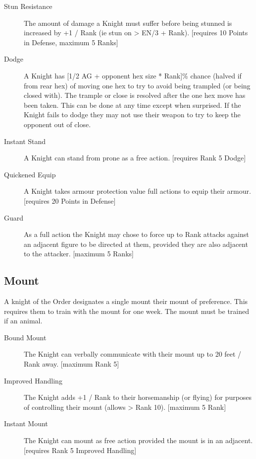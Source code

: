 \documentclass[a4paper]{article}
\begin{document}
\begin{multicols*}{3}
\begin{description}
\item[Stun Resistance] The amount of damage a Knight must suffer
  before being stunned is increased by +1 / Rank (ie stun on > EN/3 +
  Rank).  [requires 10 Points in Defense, maximum 5 Ranks]

\item[Dodge] A Knight has [1/2 AG + opponent hex size * Rank]\% chance
  (halved if from rear hex) of moving one hex to try to avoid being
  trampled (or being closed with).  The trample or close is resolved
  after the one hex move has been taken.  This can be done at any time
  except when surprised.  If the Knight fails to dodge they may not
  use their weapon to try to keep the opponent out of close.

\item[Instant Stand] A Knight can stand from prone as a free action.
  [requires Rank 5 Dodge]

\item[Quickened Equip] A Knight takes armour protection value full
  actions to equip their armour.  [requires 20 Points in Defense]
 
\item[Guard] As a full action the Knight may chose to force up to Rank
  attacks against an adjacent figure to be directed at them, provided
  they are also adjacent to the attacker.  [maximum 5 Ranks]

\end{description}

\subsection{Mount}

A knight of the Order designates a single mount their mount of
preference.  This requires them to train with the mount for one week.
The mount must be trained if an animal.

\begin{description}

\item[Bound Mount] The Knight can verbally communicate with their
  mount up to 20 feet / Rank away.  [maximum Rank 5]

\item[Improved Handling] The Knight adds +1 / Rank to their
  horsemanship (or flying) for purposes of controlling their mount
  (allows > Rank 10).  [maximum 5 Rank]

\item[Instant Mount] The Knight can mount as free action provided the
  mount is in an adjacent.  [requires Rank 5 Improved Handling]


\end{description}
\end{multicols*}
\end{document}
